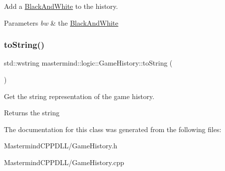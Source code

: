 Add a \hyperlink{classmastermind_1_1logic_1_1_black_and_white}{Black\+And\+White} to the history. 
\begin{DoxyParams}{Parameters}
{\em bw} & the \hyperlink{classmastermind_1_1logic_1_1_black_and_white}{Black\+And\+White} \\
\hline
\end{DoxyParams}
\hypertarget{classmastermind_1_1logic_1_1_game_history_a4b2d573dd63908a204a8bbd73d426d46}{}\label{classmastermind_1_1logic_1_1_game_history_a4b2d573dd63908a204a8bbd73d426d46} 
\subsubsection{\texorpdfstring{to\+String()}{toString()}}
{\footnotesize\ttfamily std\+::wstring mastermind\+::logic\+::\+Game\+History\+::to\+String (\begin{DoxyParamCaption}{ }\end{DoxyParamCaption})}

Get the string representation of the game history. \begin{DoxyReturn}{Returns}
the string 
\end{DoxyReturn}


The documentation for this class was generated from the following files\+:\begin{DoxyCompactItemize}
\item 
Mastermind\+C\+P\+P\+D\+L\+L/Game\+History.\+h\item 
Mastermind\+C\+P\+P\+D\+L\+L/Game\+History.\+cpp\end{DoxyCompactItemize}
